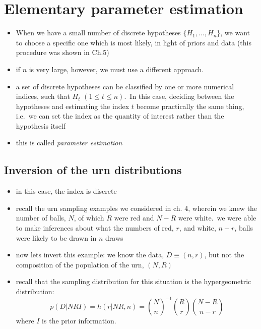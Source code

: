 \documentclass[../jaynes_prob_theory_notes.tex]{subfiles}
\begin{document}
\section{Elementary parameter estimation}
    \begin{itemize}
        \item When we have a small number of discrete hypotheses $\{H_1, \ldots, H_n\}$, we want to choose a specific one which is most likely, in light of priors and data (this procedure was shown in Ch.5)
        \item if $n$ is very large, however, we must use a different approach.
        \item a set of discrete hypotheses can be classified by one or more numerical indices, such that $H_t$ $(1 \leq t \leq n)$.\ In this case, deciding between the hypotheses and estimating the index $t$ become practically the same thing, i.e.\ we can set the index as the quantity of interest rather than the hypothesis itself
        \item this is called \textit{parameter estimation}
    \end{itemize}

\subsection{Inversion of the urn distributions}
    \begin{itemize}
        \item in this case, the index is discrete
        \item recall the urn sampling examples we considered in ch. 4, wherein we knew the number of balls, $N$, of which $R$ were red and $N-R$ were white.\ we were able to make inferences about what the numbers of red, $r$, and white, $n-r$, balls were likely to be drawn in $n$ draws
        \item now lets invert this example: we know the data, $D \equiv (n, r)$, but not the composition of the population of the urn, $(N, R)$
        \item recall that the sampling distribution for this situation is the hypergeometric distribution:
            \begin{equation*}
                p(D|NRI) = h(r|NR,n) = \binom{N}{n}^{-1} \binom{R}{r} \binom{N-R}{n-r}
            \end{equation*}
        where $I$ is the prior information.
    \end{itemize}
\end{document}
